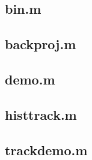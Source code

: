 \documentclass{article}
\begin{document}


\subsection{bin.m}



\subsection{backproj.m}



\subsection{demo.m}



\subsection{histtrack.m}



\subsection{trackdemo.m}


\end{document}
